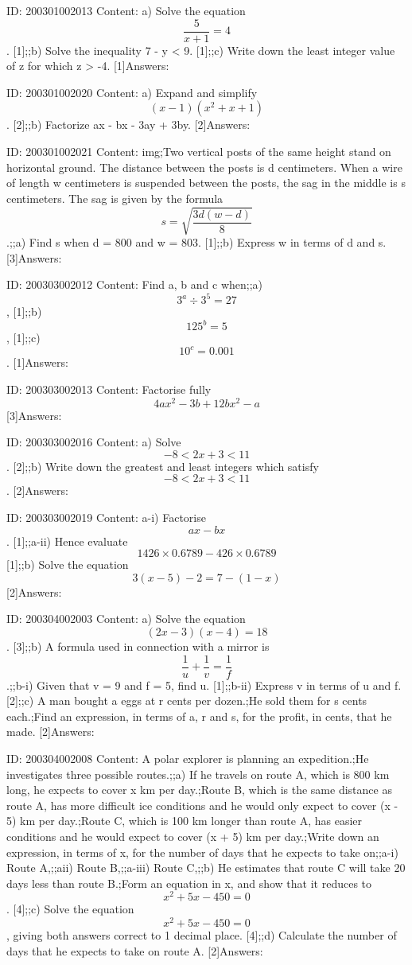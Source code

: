 \documentclass{article}
\begin{document}
ID: 200301002013
Content:
a) Solve the equation $$\frac{5}{x+1}=4$$. [1];;b) Solve the inequality 7 - y < 9. [1];;c) Write down the least integer value of z for which  z > -4. [1]Answers:

ID: 200301002020
Content:
a) Expand and simplify $$(x-1)(x^{2} +x+1)$$. [2];;b) Factorize ax - bx - 3ay + 3by. [2]Answers:

ID: 200301002021
Content:
img;Two vertical posts of the same height stand on horizontal ground. The distance between the posts is d centimeters. When a wire of length w centimeters is suspended between the posts, the sag in the middle is s centimeters. The sag is given by the formula $$s=\sqrt{\frac{3d(w-d)}{8}}$$.;;a) Find s when d = 800 and w = 803. [1];;b) Express w in terms of d and s. [3]Answers:

ID: 200303002012
Content:
Find a, b and c when;;a) $$3^a \div 3^5 =27$$,   [1];;b) $$125^b = 5$$,   [1];;c) $$10^c = 0.001$$.   [1]Answers:

ID: 200303002013
Content:
Factorise fully $$4ax^2 - 3b + 12bx^2 - a$$ [3]Answers:

ID: 200303002016
Content:
a) Solve $$-8 < 2x + 3 < 11$$. [2];;b) Write down the greatest and least integers which satisfy $$-8 < 2x + 3 < 11$$. [2]Answers:

ID: 200303002019
Content:
a-i) Factorise $$ax - bx$$.   [1];;a-ii) Hence evaluate $$1426 \times 0.6789 - 426 \times 0.6789$$ [1];;b) Solve the equation $$3(x - 5) -2 = 7 - (1 - x)$$ [2]Answers:

ID: 200304002003
Content:
a) Solve the equation $$(2x - 3)(x - 4) = 18$$.   [3];;b) A formula used in connection with a mirror is $$\frac{1}{u} + \frac{1}{v} = \frac{1}{f}$$.;;b-i) Given that v = 9 and f = 5, find u.   [1];;b-ii) Express v in terms of u and f.   [2];;c) A man bought a eggs at r cents per dozen.;He sold them for s cents each.;Find an expression, in terms of a, r and s, for the profit, in cents, that he made.   [2]Answers:

ID: 200304002008
Content:
A polar explorer is planning an expedition.;He investigates three possible routes.;;a) If he travels on route A, which is 800 km long, he expects to cover x km per day.;Route B, which is the same distance as route A, has more difficult ice conditions and he would only expect to cover (x - 5) km per day.;Route C, which is 100 km longer than route A, has easier conditions and he would expect to cover (x + 5) km per day.;Write down an expression, in terms of x, for the number of days that he expects to take on;;a-i) Route A,;;aii) Route B,;;a-iii) Route C,;;b) He estimates that route C will take 20 days less than route B.;Form an equation in x, and show that it reduces to $$x^2 + 5x - 450 = 0$$. [4];;c) Solve the equation $$x^2 + 5x - 450 = 0$$, giving both answers correct to 1 decimal place.   [4];;d) Calculate the number of days that he expects to take on route A.   [2]Answers:
\end{document}
